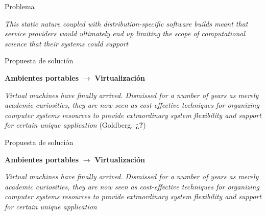 \documentclass[11pt]{beamer}
\begin{document}
\begin{frame}{Problema}

	\begin{center}
		{\huge\textit{This static nature coupled with distribution-specific software builds meant that service providers would ultimately end up limiting the scope of computational science that their systems could support}\citep{kurtzer2017singularity}}
	\end{center}

\end{frame}
\begin{frame}{Propuesta de solución\citep{kurtzer2017singularity}}
	
	\begin{center}
		{\Large \textbf{Ambientes portables} $\rightarrow$ \textbf{Virtualización}}
	\end{center}
	
	\begin{center}
		{\Large\textit{Virtual machines have ﬁnally arrived. Dismissed for a number of years as merely academic curiosities, they are now seen as cost-eﬀective techniques
for organizing computer systems resources to provide extraordinary system
ﬂexibility and support for certain unique application} (Goldberg, \textbf{¿?})}
	\end{center}

\end{frame}

\begin{frame}{Propuesta de solución\citep{kurtzer2017singularity}}
	
	\begin{center}
		{\Large \textbf{Ambientes portables} $\rightarrow$ \textbf{Virtualización}}
	\end{center}
	
	\begin{center}
		{\Large\textit{Virtual machines have ﬁnally arrived. Dismissed for a number of years as
merely academic curiosities, they are now seen as cost-eﬀective techniques
for organizing computer systems resources to provide extraordinary system
ﬂexibility and support for certain unique application} \citep{goldberg1974survey}}
	\end{center}

\end{frame}
\end{document}
